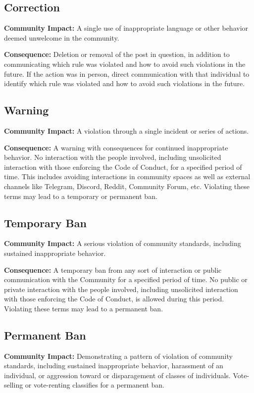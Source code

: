 \subsection{Correction}

\textbf{Community Impact:} A single use of inappropriate language or other behavior deemed unwelcome in the community.

\textbf{Consequence:} Deletion or removal of the post in question, in addition to communicating which rule was violated and how to avoid such violations in the future.
If the action was in person, direct communication with that individual to identify which rule was violated and how to avoid such violations in the future.


\subsection{Warning}

\textbf{Community Impact:} A violation through a single incident or series of actions.

\textbf{Consequence:} A warning with consequences for continued inappropriate behavior.
No interaction with the people involved, including unsolicited interaction with those enforcing the Code of Conduct, for a specified period of time.
This includes avoiding interactions in community spaces as well as external channels like Telegram, Discord, Reddit, Community Forum, etc.
Violating these terms may lead to a temporary or permanent ban.


\subsection{Temporary Ban}

\textbf{Community Impact:} A serious violation of community standards, including sustained inappropriate behavior.

\textbf{Consequence:} A temporary ban from any sort of interaction or public communication with the Community for a specified period of time.
No public or private interaction with the people involved, including unsolicited interaction with those enforcing the Code of Conduct, is allowed during this period.
Violating these terms may lead to a permanent ban.


\subsection{Permanent Ban}

\textbf{Community Impact:} Demonstrating a pattern of violation of community standards, including sustained inappropriate behavior, harassment of an individual, or aggression toward or disparagement of classes of individuals.
Vote-selling or vote-renting classifies for a permanent ban.


